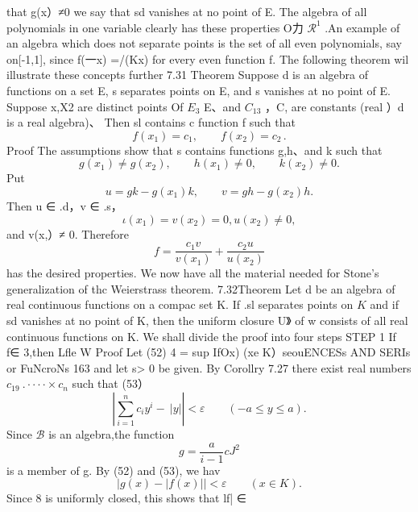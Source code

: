 that g(x）≠0 we say that sd vanishes at no point of E. The algebra of all polynomials in one variable clearly has these properties O力 $\textstyle{\mathcal{R}}^{1}$ .An example of an algebra which does not separate points is the set of all even polynomials, say on[-1,1], since f(一x) =/(Kx) for every even function f. The following theorem wil illustrate these concepts further 7.31 Theorem Suppose d is an algebra of functions on a set E, s separates points on E, and s vanishes at no point of E. Suppose x,X2 are distinct points Of $\textstyle{E_{3}}$ E、and $C_{13}$ ，C, are constants (real ）d is a real algebra)、 Then sl contains c function f such that $$ f(x_{1})=c_{1},\qquad f(x_{2})=c_{2}\,. $$ Proof The assumptions show that s contains functions g,h、and k such that $$ g(x_{1})\neq g(x_{2}),\qquad h(x_{1})\neq0,\qquad k(x_{2})\neq0. $$ Put $$ u=g k-g(x_{1})k,\qquad v=g h-g(x_{2})h. $$ Then u ∈ .d，v ∈ .s， $$ \iota(x_{1})=v(x_{2})=0,u(x_{2})\neq0, $$ and v(x,）≠ 0. Therefore $$ f={\frac{c_{1}v}{v(x_{1})}}+{\frac{c_{2}u}{u(x_{2})}} $$ has the desired properties. We now have all the material needed for Stone's generalization of thc Weierstrass theorem. 7.32Theorem Let d be an algebra of real continuous functions on a compac set K. If .sl separates points on $\textstyle K$ and if sd vanishes at no point of K, then the uniform closure U》 of w consists of all real continuous functions on K. We shall divide the proof into four steps STEP 1 If f∈ 3,then Lfle W Proof Let (52) 4 = sup IfOx) (xe K）seouENCESs AND SERIs or FuNcroNs 163 and let s> 0 be given. By Corollry 7.27 there exist real numbers $c_{19}\ .\cdot\cdot\cdot\cdot\times c_{n}$ such that (53） $$ \left|\sum_{i=1}^{n}c_{i}y^{i}-\ |y|\right|<\varepsilon\qquad(-a\leq y\leq a). $$ Since ${\mathcal{B}}$ is an algebra,the function $$ g={\frac{a}{i-1}}c J^{2} $$ is a member of g. By (52) and (53), we hav $$ |g(x)-|f(x)||<\varepsilon\qquad(x\in K). $$ Since 8 is uniformly closed, this shows that lf| ∈ %